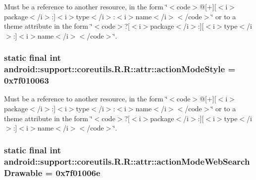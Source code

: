 Must be a reference to another resource, in the form \char`\"{}$<$code$>$@\mbox{[}+\mbox{]}\mbox{[}$<$i$>$package$<$/i$>$:\mbox{]}$<$i$>$type$<$/i$>$:$<$i$>$name$<$/i$>$$<$/code$>$\char`\"{} or to a theme attribute in the form \char`\"{}$<$code$>$?\mbox{[}$<$i$>$package$<$/i$>$:\mbox{]}\mbox{[}$<$i$>$type$<$/i$>$:\mbox{]}$<$i$>$name$<$/i$>$$<$/code$>$\char`\"{}. \hypertarget{classandroid_1_1support_1_1coreutils_1_1_r_1_1attr_d0255ac1b049481f274376c50334c7cd}{
\subsubsection[{actionModeStyle}]{\setlength{\rightskip}{0pt plus 5cm}static final int android::support::coreutils.R.R::attr::actionModeStyle = 0x7f010063}}
\label{classandroid_1_1support_1_1coreutils_1_1_r_1_1attr_d0255ac1b049481f274376c50334c7cd}


Must be a reference to another resource, in the form \char`\"{}$<$code$>$@\mbox{[}+\mbox{]}\mbox{[}$<$i$>$package$<$/i$>$:\mbox{]}$<$i$>$type$<$/i$>$:$<$i$>$name$<$/i$>$$<$/code$>$\char`\"{} or to a theme attribute in the form \char`\"{}$<$code$>$?\mbox{[}$<$i$>$package$<$/i$>$:\mbox{]}\mbox{[}$<$i$>$type$<$/i$>$:\mbox{]}$<$i$>$name$<$/i$>$$<$/code$>$\char`\"{}. \hypertarget{classandroid_1_1support_1_1coreutils_1_1_r_1_1attr_b6cc24a004cbcdd8af957a1972cbd722}{
\subsubsection[{actionModeWebSearchDrawable}]{\setlength{\rightskip}{0pt plus 5cm}static final int android::support::coreutils.R.R::attr::actionModeWebSearchDrawable = 0x7f01006e}}
\label{classandroid_1_1support_1_1coreutils_1_1_r_1_1attr_b6cc24a004cbcdd8af957a1972cbd722}


